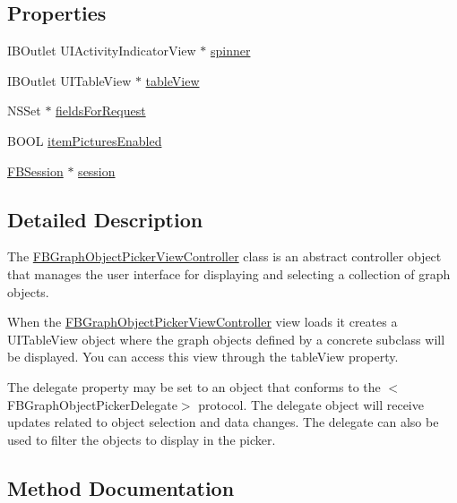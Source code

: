 \subsection*{Properties}
\begin{DoxyCompactItemize}
\item 
I\+B\+Outlet U\+I\+Activity\+Indicator\+View $\ast$ \hyperlink{interfaceFBGraphObjectPickerViewController_a51b10ee00428f30b615f15e087d4430a}{spinner}
\item 
I\+B\+Outlet U\+I\+Table\+View $\ast$ \hyperlink{interfaceFBGraphObjectPickerViewController_a1d05e89ab63e8f4790585a060820fd24}{table\+View}
\item 
N\+S\+Set $\ast$ \hyperlink{interfaceFBGraphObjectPickerViewController_a824e5bcdb050b9d196d840e95d33ed81}{fields\+For\+Request}
\item 
B\+O\+OL \hyperlink{interfaceFBGraphObjectPickerViewController_a90618fdbdb8d40a9278fae76f7e38d99}{item\+Pictures\+Enabled}
\item 
\hyperlink{interfaceFBSession}{F\+B\+Session} $\ast$ \hyperlink{interfaceFBGraphObjectPickerViewController_afce63208422a34ca2bfd933812332734}{session}
\end{DoxyCompactItemize}


\subsection{Detailed Description}
The {\ttfamily \hyperlink{interfaceFBGraphObjectPickerViewController}{F\+B\+Graph\+Object\+Picker\+View\+Controller}} class is an abstract controller object that manages the user interface for displaying and selecting a collection of graph objects.

When the {\ttfamily \hyperlink{interfaceFBGraphObjectPickerViewController}{F\+B\+Graph\+Object\+Picker\+View\+Controller}} view loads it creates a {\ttfamily U\+I\+Table\+View} object where the graph objects defined by a concrete subclass will be displayed. You can access this view through the {\ttfamily table\+View} property.

The {\ttfamily delegate} property may be set to an object that conforms to the $<$\+F\+B\+Graph\+Object\+Picker\+Delegate$>$ protocol. The {\ttfamily delegate} object will receive updates related to object selection and data changes. The delegate can also be used to filter the objects to display in the picker. 

\subsection{Method Documentation}
\mbox{\label{interfaceFBGraphObjectPickerViewController_aa73bb2a67b80e42227f81f4fba16e7b4}} 
